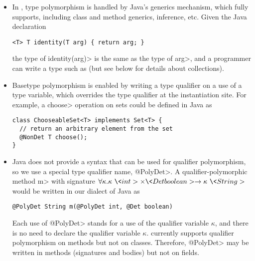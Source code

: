 \begin{itemize}
\item
In \theDeterminismCheckerImplementation,
type polymorphism is handled by Java's generics mechanism, which
\theDeterminismChecker fully supports, including class and method generics,
inference, etc.
Given the Java declaration
\begin{Verbatim}
<T> T identity(T arg) { return arg; }
\end{Verbatim}
the type of \<identity(arg)> is the same as the type of
\<arg>, and a programmer can write a type such as  (but see below for details about collections).
\item
Basetype polymorphism is enabled by writing a type qualifier on a use of a
type variable, which overrides the type qualifier at the instantiation
site.
For example, a \<choose> operation on sets could be defined in Java as
\begin{Verbatim}
class ChooseableSet<T> implements Set<T> {
  // return an arbitrary element from the set
  @NonDet T choose();
}
\end{Verbatim}
\item
Java does not provide a syntax that can be used for qualifier polymorphism,
so we use a special type qualifier name, \<@PolyDet>.
A qualifier-polymorphic method \<m> with signature $\forall \kappa . \kappa\ \<int> \times \<Det boolean> \rightarrow
\kappa\ \<String>$ would be written in our dialect of Java as
\begin{Verbatim}
@PolyDet String m(@PolyDet int, @Det boolean)
\end{Verbatim}
Each use of \<@PolyDet> stands for a use of the qualifier variable
$\kappa$, and there is no need to declare the qualifier variable $\kappa$.
\TheDeterminismChecker currently supports
qualifier
polymorphism on methods but not on classes.
Therefore, \<@PolyDet> may be written in methods (signatures and bodies)
but not on fields.
\end{itemize}

